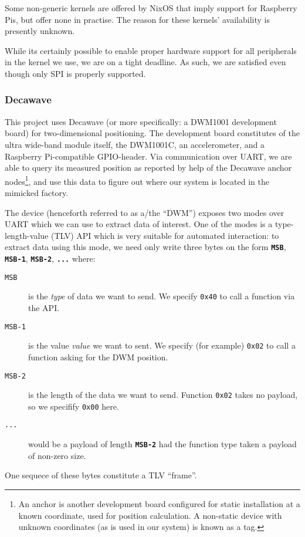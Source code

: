 Some non-generic kernels are offered by NixOS that imply support for Raspberry Pis, but offer none in practise.
The reason for these kernels' availability is presently unknown.

While its certainly possible to enable proper hardware support for all peripherals in the kernel we use, we are on a tight deadline.
As such, we are satisfied even though only SPI is properly supported.


\subsubsection{Decawave}
This project uses Decawave (or more specifically: a DWM1001 development board) for two-dimensional positioning.
The development board constitutes of the ultra wide-band module itself, the DWM1001C, an accelerometer,
and a Raspberry Pi-compatible GPIO-header.
Via communication over UART, we are able to query its measured position as reported by help of the Decawave anchor nodes\footnote{An anchor is another development board configured for static installation at a known coordinate, used for position calculation. A non-static device with unknown coordinates (as is used in our system) is known as a tag.},
and use this data to figure out where our system is located in the mimicked factory.

The device (henceforth referred to as a/the ``DWM'') exposes two modes over UART which we can use to extract data of interest.
One of the modes is a type-length-value (TLV) API which is very suitable for automated interaction:
to extract data using this mode, we need only write three bytes on the form \texttt{\textbf{MSB}}, \texttt{\textbf{MSB-1}}, \texttt{\textbf{MSB-2}}, \texttt{\textbf{...}} where:
\begin{description}
\item[\texttt{MSB}] is the \textit{type} of data we want to send. We specify \texttt{0x40} to call a function via the API.
\item[\texttt{MSB-1}] is the value \textit{value} we want to sent. We specify (for example) \texttt{0x02} to call a function asking for the DWM position.
\item[\texttt{MSB-2}] is the length of the data we want to send. Function \texttt{0x02} takes no payload, so we specifify \texttt{0x00} here.
\item[\texttt{...}] would be a payload of length \texttt{\textbf{MSB-2}} had the function type taken a payload of non-zero size.
\end{description}
One sequece of these bytes constitute a TLV ``frame''.

